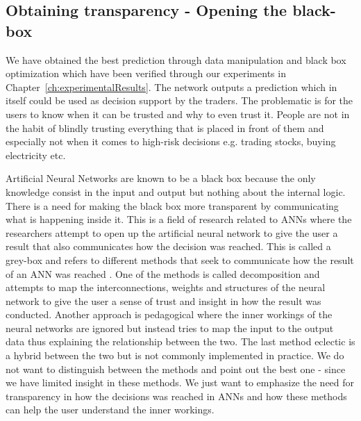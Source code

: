 \subsection{Obtaining transparency - Opening the black-box}
We have obtained the best prediction through data manipulation and black box optimization which have been verified through our experiments in Chapter~\ref{ch:experimentalResults}. The network outputs a prediction which in itself could be used as decision support by the traders. The problematic is for the users to know when it can be trusted and why to even trust it. People are not in the habit of blindly trusting everything that is placed in front of them and especially not when it comes to high-risk decisions e.g. trading stocks, buying electricity etc.

Artificial Neural Networks are known to be a black box \cite{fromBlackBoxToTransparentBox} because the only knowledge consist in the input and output but nothing about the internal logic. There is a need for making the black box more transparent by communicating what is happening inside it. This is a field of research related to ANNs where the researchers attempt to open up the artificial neural network to give the user a result that also communicates how the decision was reached. This is called a grey-box and refers to different methods that seek to communicate how the result of an ANN was reached \cite{young2010using}. One of the methods is called decomposition and attempts to map the interconnections, weights and structures of the neural network to give the user a sense of trust and insight in how the result was conducted. Another approach is pedagogical where the inner workings of the neural networks are ignored but instead tries to map the input to the output data thus explaining the relationship between the two. The last method eclectic is a hybrid between the two but is not commonly implemented in practice. We do not want to distinguish between the methods and point out the best one - since we have limited insight in these methods. We just want to emphasize the need for transparency in how the decisions was reached in ANNs and how these methods can help the user understand the inner workings.

